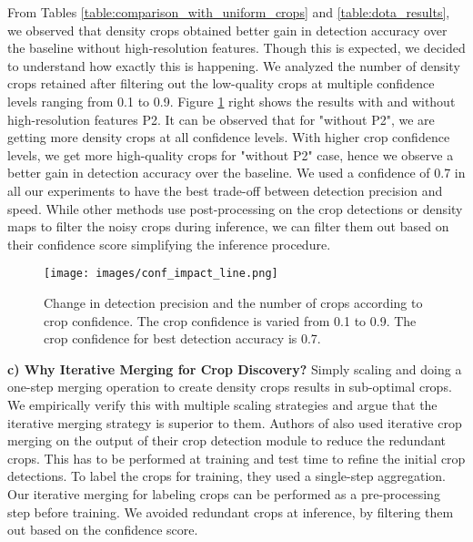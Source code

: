 From Tables \ref{table:comparison_with_uniform_crops} and \ref{table:dota_results}, we observed that density crops obtained better gain in detection accuracy over the baseline without high-resolution features. Though this is expected, we decided to understand how exactly this is happening. We analyzed the number of density crops retained after filtering out the low-quality crops at multiple confidence levels ranging from 0.1 to 0.9. Figure \ref{fig:conf_impact} right shows the results with and without high-resolution features P2. It can be observed that for "without P2", we are getting more density crops at all confidence levels. With higher crop confidence levels, we get more high-quality crops for "without P2" case, hence we observe a better gain in detection accuracy over the baseline. We used a confidence of 0.7 in all our experiments to have the best trade-off between detection precision and speed. While other methods use post-processing on the crop detections \cite{clusnet-Yang-2019} or density maps \cite{dmap-Li-2020} to filter the noisy crops during inference, we can filter them out based on their confidence score simplifying the inference procedure.
\begin{figure}[h!]
  \centering
  \texttt{[image: images/conf\_impact\_line.png]} 
  \caption{Change in detection precision and the number of crops according to crop confidence. The crop confidence is varied from 0.1 to 0.9. The crop confidence for best detection accuracy is 0.7.}
  \label{fig:conf_impact}
\end{figure}

\noindent \textbf{c) Why Iterative Merging for Crop Discovery?}  
Simply scaling and doing a one-step merging operation to create density crops results in sub-optimal crops. We empirically verify this with multiple scaling strategies and argue that the iterative merging strategy is superior to them. Authors of \cite{clusnet-Yang-2019} also used iterative crop merging on the output of their crop detection module to reduce the redundant crops. This has to be performed at training and test time to refine the initial crop detections. To label the crops for training, they used a single-step aggregation. Our iterative merging for labeling crops can be performed as a pre-processing step before training. We avoided redundant crops at inference, by filtering them out based on the confidence score.

